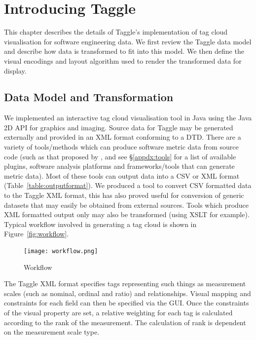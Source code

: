 \chapter{Introducing Taggle}


\label{chap:taggle}
\ifpdf
    \graphicspath{{Chapters/Taggle/TaggleFigs/PNG/}{Chapters/Taggle/TaggleFigs/PDF/}{Chapters/Taggle/TaggleFigs/}}
\else
    \graphicspath{{Chapters/Taggle/TaggleFigs/EPS/}{Chapters/Taggle/TaggleFigs/}}
\fi  

This chapter describes the details of Taggle's implementation of tag cloud visualisation for software engineering data.  We first review the Taggle data model and describe how data is transformed to fit into this model. We then define the visual encodings and layout algorithm used to render the transformed data for display.

\section{Data Model and Transformation}

We implemented an interactive tag cloud visualisation tool in Java using the Java 2D API for graphics and imaging. Source data for Taggle may be generated externally and provided in an XML format conforming to a DTD. There are a variety of tools/methods which can produce software metric data from source code (such as that proposed by \citep{irwin03}, and see \S\vref{appdx:tools} for a list of available plugins, software analysis platforms and frameworks/tools that can generate metric data). Most of these tools can output data into a CSV or XML format (Table~\vref{table:outputformat}). We produced a tool to convert CSV formatted data to the Taggle XML format, this has also proved useful for conversion of generic datasets that may easily be obtained from external sources. Tools which produce XML formatted output only may also be transformed (using XSLT for example). Typical workflow involved in generating a tag cloud is shown in Figure~\vref{fig:workflow}.

\begin{figure} [h!]
  	\centering
   	\texttt{[image: workflow.png]}
  	\caption{Workflow}
	\label{fig:workflow}
\end{figure}

The Taggle XML format specifies tags representing such things as measurement scales (such as nominal, ordinal and ratio) and relationships. Visual mapping and constraints for each field can then be specified via the GUI. Once the constraints of the visual property are set, a relative weighting for each tag is calculated according to the rank of the measurement. The calculation of rank is dependent on the measurement scale type. 

